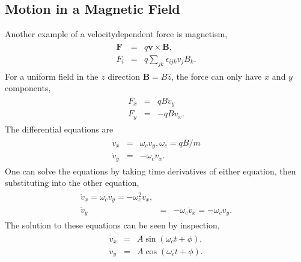 \documentclass[letterpaper,10pt,english]{sphinxmanual}
\begin{document}
\subsection{Motion in a Magnetic Field}
\label{\detokenize{chapter2:motion-in-a-magnetic-field}}
Another example of a velocity\sphinxhyphen{}dependent force is magnetism,
\begin{equation*}
\begin{split}
\begin{eqnarray}
\boldsymbol{F}&=&q\boldsymbol{v}\times\boldsymbol{B},\\
\nonumber
F_i&=&q\sum_{jk}\epsilon_{ijk}v_jB_k.
\end{eqnarray}
\end{split}
\end{equation*}
For a uniform field in the \(z\) direction \(\boldsymbol{B}=B\hat{z}\), the force can only have \(x\) and \(y\) components,
\begin{equation*}
\begin{split}
\begin{eqnarray}
F_x&=&qBv_y\\
\nonumber
F_y&=&-qBv_x.
\end{eqnarray}
\end{split}
\end{equation*}
The differential equations are
\begin{equation*}
\begin{split}
\begin{eqnarray}
\dot{v}_x&=&\omega_c v_y,\omega_c= qB/m\\
\nonumber
\dot{v}_y&=&-\omega_c v_x.
\end{eqnarray}
\end{split}
\end{equation*}
One can solve the equations by taking time derivatives of either equation, then substituting into the other equation,
\begin{equation*}
\begin{split}
\begin{eqnarray}
\ddot{v}_x=\omega_c\dot{v_y}=-\omega_c^2v_x,\\
\nonumber
\ddot{v}_y&=&-\omega_c\dot{v}_x=-\omega_cv_y.
\end{eqnarray}
\end{split}
\end{equation*}
The solution to these equations can be seen by inspection,
\begin{equation*}
\begin{split}
\begin{eqnarray}
v_x&=&A\sin(\omega_ct+\phi),\\
\nonumber
v_y&=&A\cos(\omega_ct+\phi).
\end{eqnarray}
\end{split}
\end{equation*}
\end{document}
